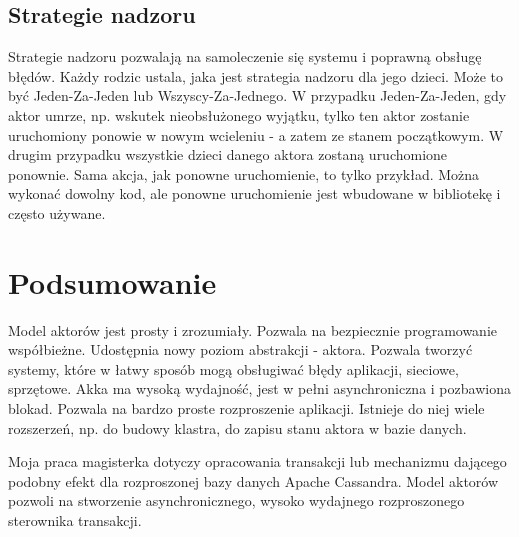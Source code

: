 \documentclass[oneside, 12pt, a4paper]{article}
\begin{document}
\begin{multicols}{2}
\subsection{Strategie nadzoru}
Strategie nadzoru pozwalają na samoleczenie się systemu i poprawną obsługę błędów. Każdy rodzic ustala, jaka jest strategia nadzoru dla jego dzieci. Może to być Jeden-Za-Jeden lub Wszyscy-Za-Jednego. W przypadku Jeden-Za-Jeden, gdy aktor umrze, np. wskutek nieobsłużonego wyjątku, tylko ten aktor zostanie uruchomiony ponowie w nowym wcieleniu - a zatem ze stanem początkowym. W drugim przypadku wszystkie dzieci danego aktora zostaną uruchomione ponownie. Sama akcja, jak ponowne uruchomienie, to tylko przykład. Można wykonać dowolny kod, ale ponowne uruchomienie jest wbudowane w bibliotekę i często używane.

\section{Podsumowanie}
Model aktorów jest prosty i zrozumiały. Pozwala na bezpiecznie programowanie współbieżne. Udostępnia nowy poziom abstrakcji - aktora. Pozwala tworzyć systemy, które w łatwy sposób mogą obsługiwać błędy aplikacji, sieciowe, sprzętowe. \mbox{Akka} ma wysoką wydajność, jest w pełni asynchroniczna i pozbawiona blokad. Pozwala na bardzo proste rozproszenie aplikacji. Istnieje do niej wiele rozszerzeń, np. do budowy klastra, do zapisu stanu aktora w bazie danych.

Moja praca magisterka dotyczy opracowania transakcji lub mechanizmu dającego podobny efekt dla rozproszonej bazy danych Apache Cassandra. Model aktorów pozwoli na stworzenie asynchronicznego, wysoko wydajnego rozproszonego sterownika transakcji.



%
%
%
%
%
%
%


\end{multicols}
\end{document}
